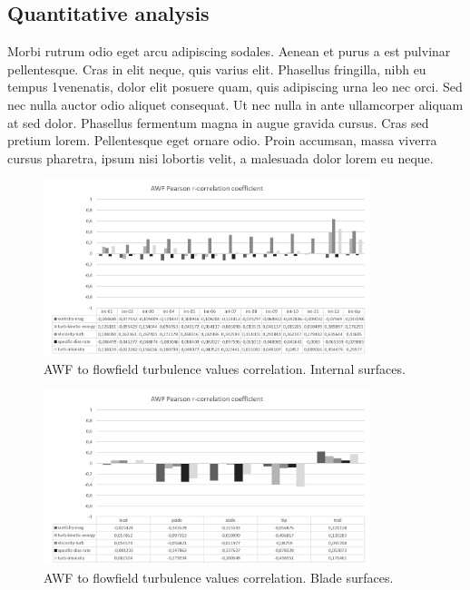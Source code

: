 \subsection{Quantitative analysis} \label{fft_res_quant}
Morbi rutrum odio eget arcu adipiscing sodales. Aenean et purus a est pulvinar pellentesque. Cras in elit neque, quis varius elit. Phasellus fringilla, nibh eu tempus 1venenatis, dolor elit posuere quam, quis adipiscing urna leo nec orci. Sed nec nulla auctor odio aliquet consequat. Ut nec nulla in ante ullamcorper aliquam at sed dolor. Phasellus fermentum magna in augue gravida cursus. Cras sed pretium lorem. Pellentesque eget ornare odio. Proin accumsan, massa viverra cursus pharetra, ipsum nisi lobortis velit, a malesuada dolor lorem eu neque.

\begin{figure}[h!]
\centering %
\includegraphics[width=0.85\textwidth]{Pictures/awf_pearson_int.png}
\caption{AWF to flowfield turbulence values correlation. Internal surfaces.}
\label{awf_corr_int}
\end{figure}

\begin{figure}[h!]
\centering %
\includegraphics[width=0.85\textwidth]{Pictures/awf_pearson_blade.png}
\caption{AWF to flowfield turbulence values correlation. Blade surfaces.}
\label{awf_corr_blade}
\end{figure}